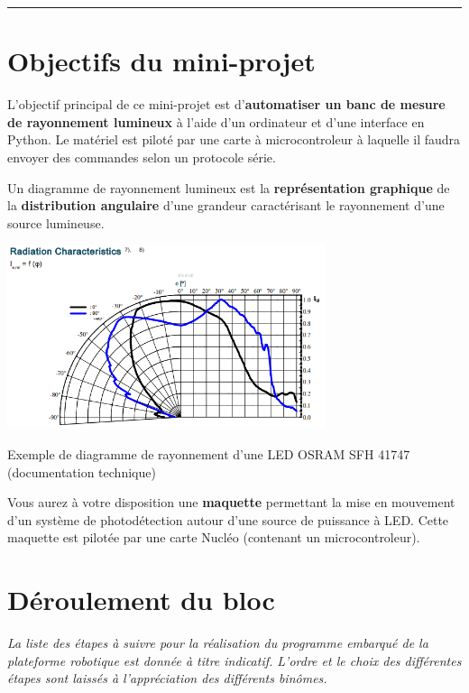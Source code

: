\documentclass[a4paper,11pt,titlepage]{article} %
\begin{document}
\noindent \rule{\linewidth}{1pt}



\section{Objectifs du mini-projet}

L'objectif principal de ce mini-projet est d'\textbf{automatiser un banc de mesure de rayonnement lumineux} à l'aide d'un ordinateur et d'une interface en Python. Le matériel est piloté par une carte à microcontroleur à laquelle il faudra envoyer des commandes selon un protocole série.

\medskip

Un diagramme de rayonnement lumineux est la \textbf{représentation graphique} de la \textbf{distribution angulaire} d'une grandeur caractérisant le rayonnement d'une source lumineuse.

\begin{center}
	\includegraphics[width=0.7\textwidth]{images/osram_sfh41747.png}
	
	Exemple de diagramme de rayonnement d'une LED OSRAM SFH 41747 (documentation technique)
\end{center}


\medskip

Vous aurez à votre disposition une \textbf{maquette} permettant la mise en mouvement d'un système de photodétection autour d'une source de puissance à LED. Cette maquette est pilotée par une carte Nucléo (contenant un microcontroleur).



\section{Déroulement du bloc}

\textit{La liste des étapes à suivre pour la réalisation du programme embarqué de la plateforme robotique est donnée à titre indicatif. L'ordre et le choix des différentes étapes sont laissés à l'appréciation des différents binômes.}
\end{document}
